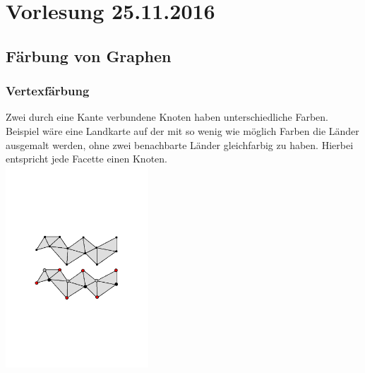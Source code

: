 \section{Vorlesung 25.11.2016}
\subsection{Färbung von Graphen}
\subsubsection{Vertexfärbung}
Zwei durch eine Kante verbundene Knoten haben unterschiedliche Farben.\\
Beispiel wäre eine Landkarte auf der mit so wenig wie möglich Farben die Länder ausgemalt werden, ohne zwei benachbarte Länder gleichfarbig zu haben. Hierbei entspricht jede Facette einen Knoten.\\
\includegraphics[width=0.4\textwidth]{lectures/161125/pix/Vertexfaerbung}
